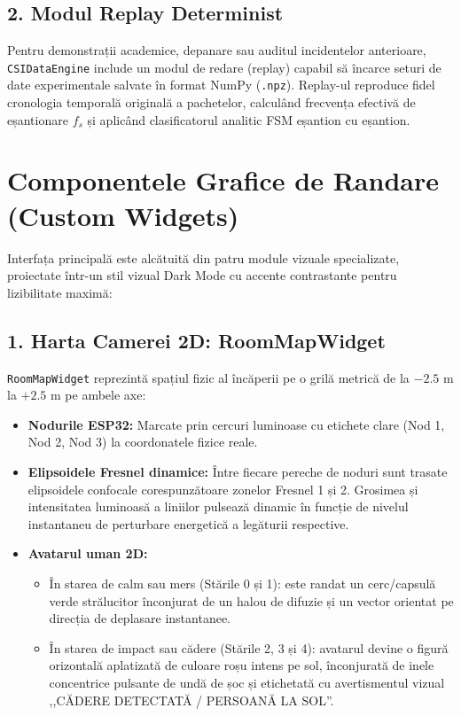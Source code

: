 \subsection{2. Modul Replay Determinist}
Pentru demonstrații academice, depanare sau auditul incidentelor anterioare, \texttt{CSIDataEngine} include un modul de redare (replay) capabil să încarce seturi de date experimentale salvate în format NumPy (\texttt{.npz}). Replay-ul reproduce fidel cronologia temporală originală a pachetelor, calculând frecvența efectivă de eșantionare $f_s$ și aplicând clasificatorul analitic FSM eșantion cu eșantion.

\section{Componentele Grafice de Randare (Custom Widgets)}
Interfața principală este alcătuită din patru module vizuale specializate, proiectate într-un stil vizual Dark Mode cu accente contrastante pentru lizibilitate maximă:

\subsection{1. Harta Camerei 2D: RoomMapWidget}
\texttt{RoomMapWidget} reprezintă spațiul fizic al încăperii pe o grilă metrică de la $-2.5\text{ m}$ la $+2.5\text{ m}$ pe ambele axe:
\begin{itemize}
    \item \textbf{Nodurile ESP32:} Marcate prin cercuri luminoase cu etichete clare (Nod 1, Nod 2, Nod 3) la coordonatele fizice reale.
    \item \textbf{Elipsoidele Fresnel dinamice:} Între fiecare pereche de noduri sunt trasate elipsoidele confocale corespunzătoare zonelor Fresnel 1 și 2. Grosimea și intensitatea luminoasă a liniilor pulsează dinamic în funcție de nivelul instantaneu de perturbare energetică a legăturii respective.
    \item \textbf{Avatarul uman 2D:}
    \begin{itemize}
        \item În starea de calm sau mers (Stările 0 și 1): este randat un cerc/capsulă verde strălucitor înconjurat de un halou de difuzie și un vector orientat pe direcția de deplasare instantanee.
        \item În starea de impact sau cădere (Stările 2, 3 și 4): avatarul devine o figură orizontală aplatizată de culoare roșu intens pe sol, înconjurată de inele concentrice pulsante de undă de șoc și etichetată cu avertismentul vizual ,,CĂDERE DETECTATĂ / PERSOANĂ LA SOL''.
    \end{itemize}
\end{itemize}

